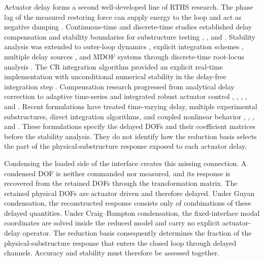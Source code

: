 \documentclass[a4paper,fleqn,review,12pt]{cas-sc}
\numberwithin{equation}{section}
\begin{document}
Actuator delay forms a second well-developed line of RTHS research. The phase lag of the measured restoring force can supply energy to the loop and act as negative damping \cite{Horiuchi1999}. Continuous-time and discrete-time studies established delay compensation and stability boundaries for substructure testing \cite{Darby2002}, \cite{Wu2005}, and \cite{Wallace2005}. Stability analysis was extended to outer-loop dynamics \cite{MercanRicles2007}, explicit integration schemes \cite{ChenRicles2008}, multiple delay sources \cite{Mercan2008}, and MDOF systems through discrete-time root-locus analysis \cite{Zhu2015}. The CR integration algorithm provided an explicit real-time implementation with unconditional numerical stability in the delay-free integration step \cite{ChenRiclesMarullo2009}. Compensation research progressed from analytical delay correction to adaptive time-series and integrated robust actuator control \cite{ChenRicles2009Delay}, \cite{ChenRicles2012}, \cite{Chae2013}, \cite{Maghareh2014}, and \cite{Ou2015}. Recent formulations have treated time-varying delay, multiple experimental substructures, direct integration algorithms, and coupled nonlinear behavior \cite{Huang2020}, \cite{HuangEffect2022}, \cite{HuangJVC2022}, and \cite{HuangEESD2022}. These formulations specify the delayed DOFs and their coefficient matrices before the stability analysis. They do not identify how the reduction basis selects the part of the physical-substructure response exposed to each actuator delay.

Condensing the loaded side of the interface creates this missing connection. A condensed DOF is neither commanded nor measured, and its response is recovered from the retained DOFs through the transformation matrix. The retained physical DOFs are actuator driven and therefore delayed. Under Guyan condensation, the reconstructed response consists only of combinations of these delayed quantities. Under Craig--Bampton condensation, the fixed-interface modal coordinates are solved inside the reduced model and carry no explicit actuator-delay operator. The reduction basis consequently determines the fraction of the physical-substructure response that enters the closed loop through delayed channels. Accuracy and stability must therefore be assessed together.
\end{document}

